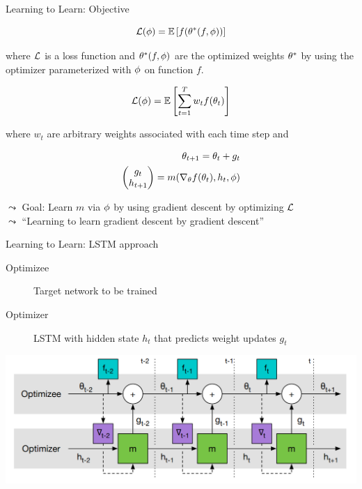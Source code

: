 \begin{frame}[c]{Learning to Learn: Objective }

\vspace{-0.5cm}
\begin{equation}
\mathcal{L}(\phi) = \mathbb{E}\left[ f(\theta^*(f,\phi)) \right]\nonumber
\end{equation}

where $\mathcal{L}$ is a loss function and $\theta^*(f,\phi)$ are the optimized weights $\theta^*$ by using the optimizer parameterized with $\phi$ on function $f$.

\pause

\begin{equation}
\mathcal{L}(\phi) = \mathbb{E}\left[\sum_{t=1}^T w_t f(\theta_t)\right]\nonumber
\end{equation}

\pause
where $w_t$ are arbitrary weights associated with each time step
and 

\pause
\vspace{-0.5cm}
\begin{eqnarray}
\theta_{t+1} = \theta_t + g_t\nonumber\\
\begin{pmatrix}g_t\\h_{t+1}\end{pmatrix} = m(\nabla_\theta f(\theta_t), h_t, \phi)\nonumber
\end{eqnarray}

\pause
$\leadsto$ Goal: Learn $m$ via $\phi$ by using gradient descent by optimizing $\mathcal{L}$ \\
\pause
$\leadsto$ ``Learning to learn gradient descent by gradient descent''
\end{frame}
\begin{frame}[c]{Learning to Learn: LSTM approach }

\begin{description}
\item[Optimizee] Target network to be trained
\item[Optimizer] LSTM with hidden state $h_t$ that predicts weight updates $g_t$
\end{description}

\medskip

\includegraphics[width=1\textwidth]{images/learning_to_learn_lstm}

\end{frame}
